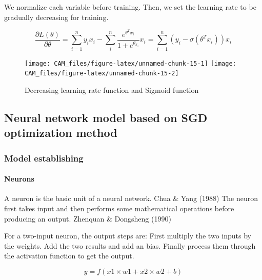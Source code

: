 \documentclass[12pt,a4paper,]{article}
\let\oldparagraph\paragraph
\renewcommand{\paragraph}[1]{\oldparagraph{#1}\mbox{}}
\begin{document}
We normalize each variable before training. Then, we set the learning
rate to be gradually decreasing for training.

\begin{equation}
\frac{\partial L(\theta)}{\partial \theta}=\sum_{i=1}^{n} y_{i} x_{i}-\sum_{i}^{n} \frac{e^{\theta^{T} x_{i}}}{1+e^{\theta_{x_{i}}}} x_{i}=\sum_{i=1}^{n}\left(y_{i}-\sigma\left(\theta^{T} x_{i}\right)\right) x_{i}
\end{equation}

\begin{figure}

{\centering \texttt{[image: CAM\_files/figure-latex/unnamed-chunk-15-1]} \texttt{[image: CAM\_files/figure-latex/unnamed-chunk-15-2]} 

}

\caption{Decreasing learning rate function and Sigmoid function}\label{fig:unnamed-chunk-15}
\end{figure}

\hypertarget{neural-network-model-based-on-sgd-optimization-method}{%
\subsection{Neural network model based on SGD optimization
method}\label{neural-network-model-based-on-sgd-optimization-method}}

\hypertarget{model-establishing-2}{%
\subsubsection{Model establishing}\label{model-establishing-2}}

\hypertarget{neurons}{%
\paragraph{Neurons}\label{neurons}}

A neuron is the basic unit of a neural network. Chua \& Yang (1988) The
neuron first takes input and then performs some mathematical operations
before producing an output. Zhenquan \& Dongsheng (1990)

For a two-input neuron, the output steps are: First multiply the two
inputs by the weights. Add the two results and add an bias. Finally
process them through the activation function to get the output.

\begin{equation}
y = f(x1 × w1 + x2 × w2 + b)
\end{equation}
\end{document}
